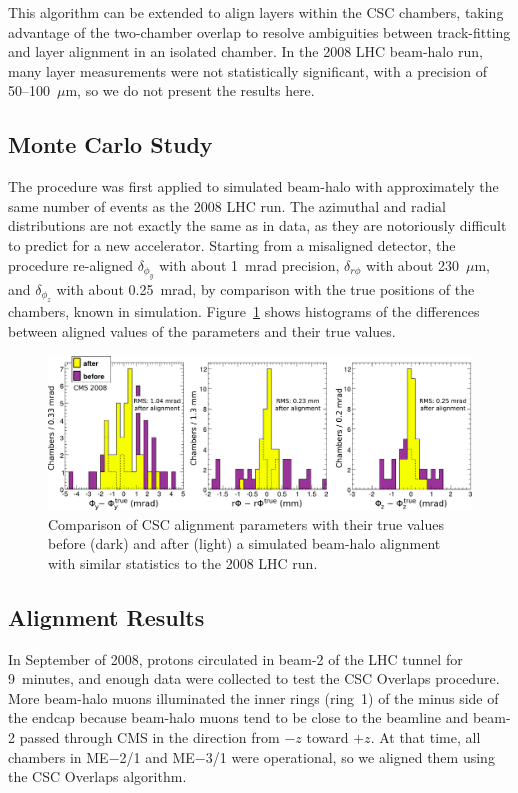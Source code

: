 This algorithm can be extended to align layers within the CSC
chambers, taking advantage of the two-chamber overlap to resolve
ambiguities between track-fitting and layer alignment in an isolated
chamber.  In the 2008 LHC beam-halo run, many layer measurements were
not statistically significant, with a precision of 50--100~$\mu$m, so
we do not present the results here.

\subsection{Monte Carlo Study}

The procedure was first applied to simulated beam-halo with
approximately the same number of events as the 2008 LHC run.  The
azimuthal and radial distributions are not exactly the same as in
data, as they are notoriously difficult to predict for a new
accelerator.  Starting from a misaligned detector, the procedure
re-aligned $\delta_{\phi_y}$ with about 1~mrad precision,
$\delta_{r\phi}$ with about 230~$\mu$m, and $\delta_{\phi_z}$ with
about 0.25~mrad, by comparison with the true positions of the
chambers, known in simulation.  Figure~\ref{fig:overlaps_mc}
shows histograms of the differences between aligned values of the
parameters and their true values.

\begin{figure}
\includegraphics[width=\linewidth]{plots/csc_overlaps_alignment/mcchamber_all.pdf}
\caption{Comparison of CSC alignment parameters with their true values before (dark) and after (light) a simulated beam-halo alignment with similar statistics to the 2008 LHC run. \label{fig:overlaps_mc}}
\end{figure}

\subsection{Alignment Results}

In September of 2008, protons circulated in beam-2 of the LHC tunnel
for 9~minutes, and enough data were collected to test the CSC Overlaps
procedure.  More beam-halo muons illuminated the inner rings (ring~1)
of the minus side of the endcap because beam-halo muons tend to be close to
the beamline and beam-2 passed through CMS in the direction from $-z$ toward $+z$.  At
that time, all chambers in ME$-$2/1 and ME$-$3/1 were operational, so
we aligned them using the CSC Overlaps algorithm.

